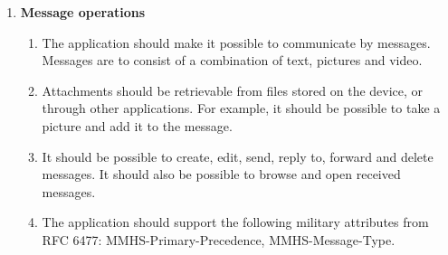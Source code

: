\begin{enumerate}
\item{}\textbf{Message operations}
\begin{enumerate}
\item{}The application should make it possible to communicate by messages. Messages are to consist of a combination of text, pictures and video.
\item{}Attachments should be retrievable from files stored on the device, or through other applications. For example, it should be possible to take a picture and add it to the message.
\item{}It should be possible to create, edit, send, reply to, forward and delete messages. It should also be possible to browse and open received messages.
\item{}The application should support the following military attributes from RFC 6477: MMHS-Primary-Precedence, MMHS-Message-Type.

\newpage


\end{enumerate}
\end{enumerate}
